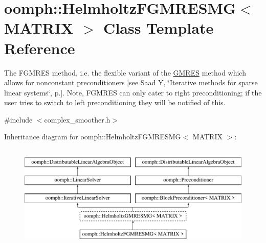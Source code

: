 \hypertarget{classoomph_1_1HelmholtzFGMRESMG}{}\section{oomph\+:\+:Helmholtz\+F\+G\+M\+R\+E\+S\+MG$<$ M\+A\+T\+R\+IX $>$ Class Template Reference}
\label{classoomph_1_1HelmholtzFGMRESMG}


The F\+G\+M\+R\+ES method, i.\+e. the flexible variant of the \hyperlink{classoomph_1_1GMRES}{G\+M\+R\+ES} method which allows for nonconstant preconditioners \mbox{[}see Saad Y, \char`\"{}\+Iterative methods for sparse linear systems\char`\"{}, p.\mbox{]}. Note, F\+G\+M\+R\+ES can only cater to right preconditioning; if the user tries to switch to left preconditioning they will be notified of this.  




{\ttfamily \#include $<$complex\+\_\+smoother.\+h$>$}

Inheritance diagram for oomph\+:\+:Helmholtz\+F\+G\+M\+R\+E\+S\+MG$<$ M\+A\+T\+R\+IX $>$\+:\begin{figure}[H]
\begin{center}
\leavevmode
\includegraphics[height=5.000000cm]{classoomph_1_1HelmholtzFGMRESMG}
\end{center}
\end{figure}
